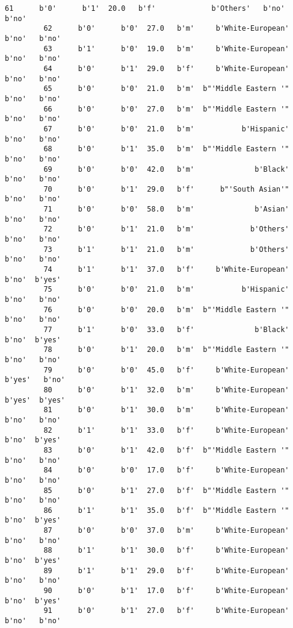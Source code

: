 \documentclass[11pt]{article}
\begin{document}
\begin{Verbatim}[commandchars=\\\{\}]
         61      b'0'      b'1'  20.0   b'f'             b'Others'   b'no'   b'no'   
         62      b'0'      b'0'  27.0   b'm'     b'White-European'   b'no'   b'no'   
         63      b'1'      b'0'  19.0   b'm'     b'White-European'   b'no'   b'no'   
         64      b'0'      b'1'  29.0   b'f'     b'White-European'   b'no'   b'no'   
         65      b'0'      b'0'  21.0   b'm'  b"'Middle Eastern '"   b'no'   b'no'   
         66      b'0'      b'0'  27.0   b'm'  b"'Middle Eastern '"   b'no'   b'no'   
         67      b'0'      b'0'  21.0   b'm'           b'Hispanic'   b'no'   b'no'   
         68      b'0'      b'1'  35.0   b'm'  b"'Middle Eastern '"   b'no'   b'no'   
         69      b'0'      b'0'  42.0   b'm'              b'Black'   b'no'   b'no'   
         70      b'0'      b'1'  29.0   b'f'      b"'South Asian'"   b'no'   b'no'   
         71      b'0'      b'0'  58.0   b'm'              b'Asian'   b'no'   b'no'   
         72      b'0'      b'1'  21.0   b'm'             b'Others'   b'no'   b'no'   
         73      b'1'      b'1'  21.0   b'm'             b'Others'   b'no'   b'no'   
         74      b'1'      b'1'  37.0   b'f'     b'White-European'   b'no'  b'yes'   
         75      b'0'      b'0'  21.0   b'm'           b'Hispanic'   b'no'   b'no'   
         76      b'0'      b'0'  20.0   b'm'  b"'Middle Eastern '"   b'no'   b'no'   
         77      b'1'      b'0'  33.0   b'f'              b'Black'   b'no'  b'yes'   
         78      b'0'      b'1'  20.0   b'm'  b"'Middle Eastern '"   b'no'   b'no'   
         79      b'0'      b'0'  45.0   b'f'     b'White-European'  b'yes'   b'no'   
         80      b'0'      b'1'  32.0   b'm'     b'White-European'  b'yes'  b'yes'   
         81      b'0'      b'1'  30.0   b'm'     b'White-European'   b'no'   b'no'   
         82      b'1'      b'1'  33.0   b'f'     b'White-European'   b'no'  b'yes'   
         83      b'0'      b'1'  42.0   b'f'  b"'Middle Eastern '"   b'no'   b'no'   
         84      b'0'      b'0'  17.0   b'f'     b'White-European'   b'no'   b'no'   
         85      b'0'      b'1'  27.0   b'f'  b"'Middle Eastern '"   b'no'   b'no'   
         86      b'1'      b'1'  35.0   b'f'  b"'Middle Eastern '"   b'no'  b'yes'   
         87      b'0'      b'0'  37.0   b'm'     b'White-European'   b'no'   b'no'   
         88      b'1'      b'1'  30.0   b'f'     b'White-European'   b'no'  b'yes'   
         89      b'1'      b'1'  29.0   b'f'     b'White-European'   b'no'   b'no'   
         90      b'0'      b'1'  17.0   b'f'     b'White-European'   b'no'  b'yes'   
         91      b'0'      b'1'  27.0   b'f'     b'White-European'   b'no'   b'no'   

\end{Verbatim}
\end{document}
